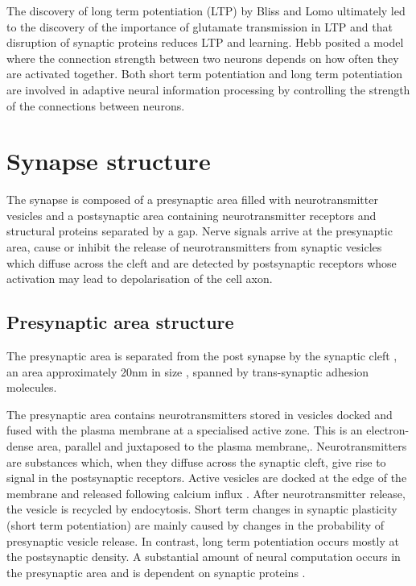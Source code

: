 The discovery of long term potentiation (LTP) by Bliss and Lomo \cite{bliss1973long} ultimately led to the discovery of the importance of glutamate transmission in LTP and that disruption of synaptic proteins reduces LTP and learning. Hebb posited a model where the connection strength between two neurons depends on how often they are activated together.  Both short term potentiation and long term potentiation are involved in adaptive neural information processing by controlling the strength of the connections between neurons\cite{xiao2013adaptive}.

\section{Synapse structure}
\label{sec:Synaptic structure}
The synapse is composed of a presynaptic area filled with neurotransmitter vesicles and a postsynaptic area containing neurotransmitter receptors and structural proteins separated by a gap. Nerve signals arrive at the presynaptic area, cause or inhibit the release of neurotransmitters from synaptic vesicles which diffuse across the cleft and are detected by postsynaptic receptors whose activation may lead to depolarisation of the cell axon. 

%
\subsection{Presynaptic area structure}
The presynaptic area is separated from the post synapse by the synaptic cleft \cite{rusakov2011shaping}, an area approximately 20nm in size \cite{zuber2005mammalian},%
spanned by trans-synaptic adhesion molecules\cite{missler2012synaptic}.

 The presynaptic area contains neurotransmitters stored in vesicles docked and fused with the plasma membrane at a specialised active zone. This is an electron-dense area, parallel and juxtaposed to the plasma membrane\cite{schoch2006molecular},\cite{sudhof2012presynaptic}. Neurotransmitters are substances which, when they diffuse across the synaptic cleft, give rise to signal in the postsynaptic receptors. Active vesicles are docked at the edge of the membrane and released following calcium influx \cite{lassek2015synaptic}. After neurotransmitter release, the vesicle is recycled by endocytosis\cite{ashery2014molecular}. Short term changes in synaptic plasticity (short term potentiation) are mainly caused by changes in the probability of presynaptic vesicle release. In contrast, long term potentiation occurs mostly at the postsynaptic density.  A substantial amount of neural computation occurs in the presynaptic area and is dependent on synaptic proteins \cite{sudhof2012presynaptic}.
 
